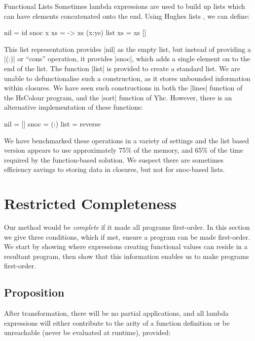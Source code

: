 \documentclass[preprint]{sigplanconf}
\begin{document}
\begin{examplename}{Functional Lists}
\label{ex:functional_lists}
Sometimes lambda expressions are used to build up lists which can have elements concatenated onto the end. Using Hughes lists \cite{hughes:lists}, we can define:

\begin{code}
nil = id
snoc x xs = \ys -> xs (x:ys)
list xs = xs []
\end{code}

This list representation provides |nil| as the empty list, but instead of providing a |(:)| or ``cons'' operation, it provides |snoc|, which adds a single element on to the end of the list. The function |list| is provided to create a standard list. We are unable to defunctionalise such a construction, as it stores unbounded information within closures. We have seen such constructions in both the |lines| function of the HsColour program, and the |sort| function of Yhc. However, there is an alternative implementation of these functions:

\begin{code}
nil = []
snoc = (:)
list = reverse
\end{code}

We have benchmarked these operations in a variety of settings and the list based version appears to use approximately 75\% of the memory, and 65\% of the time required by the function-based solution. We suspect there are sometimes efficiency savings to storing data in closures, but not for snoc-based lists.
\end{examplename}


\section{Restricted Completeness}
\label{sec:completeness}

Our method would be \textit{complete} if it made all programs first-order. In this section we give three conditions, which if met, ensure a program can be made first-order. We start by showing where expressions creating functional values can reside in a resultant program, then show that this information enables us to make programs first-order.

\subsection{Proposition}

After transformation, there will be no partial applications, and all lambda expressions will either contribute to the arity of a function definition or be unreachable (never be evaluated at runtime), provided:
\end{document}
